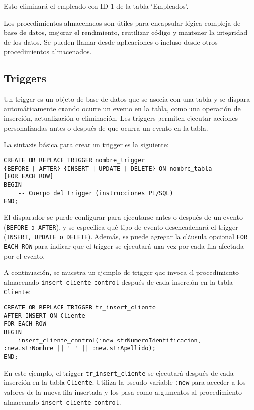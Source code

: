 \documentclass[executivepaper]{article}
\begin{document}
Esto eliminará el empleado con ID 1 de la tabla \enquote*{Empleados}.

Los procedimientos almacenados son útiles para encapsular lógica compleja de base de datos, mejorar el rendimiento, reutilizar código y mantener la integridad de los datos. Se pueden llamar desde aplicaciones o incluso desde otros procedimientos almacenados.

\subsection{Triggers}

Un trigger es un objeto de base de datos que se asocia con una tabla y se dispara automáticamente cuando ocurre un evento en la tabla, como una operación de inserción, actualización o eliminación. Los triggers permiten ejecutar acciones personalizadas antes o después de que ocurra un evento en la tabla.

La sintaxis básica para crear un trigger es la siguiente:

\begin{lstlisting}
CREATE OR REPLACE TRIGGER nombre_trigger
{BEFORE | AFTER} {INSERT | UPDATE | DELETE} ON nombre_tabla
[FOR EACH ROW]
BEGIN
    -- Cuerpo del trigger (instrucciones PL/SQL)
END;
\end{lstlisting}

El disparador se puede configurar para ejecutarse antes o después de un evento (\lstinline{BEFORE o AFTER}), y se especifica qué tipo de evento desencadenará el trigger (\lstinline{INSERT, UPDATE o DELETE}). Además, se puede agregar la cláusula opcional \lstinline{FOR EACH ROW} para indicar que el trigger se ejecutará una vez por cada fila afectada por el evento.

A continuación, se muestra un ejemplo de trigger que invoca el procedimiento almacenado \texttt{insert\_cliente\_control} después de cada inserción en la tabla \texttt{Cliente}:

\begin{lstlisting}
CREATE OR REPLACE TRIGGER tr_insert_cliente
AFTER INSERT ON Cliente
FOR EACH ROW
BEGIN
    insert_cliente_control(:new.strNumeroIdentificacion, :new.strNombre || ' ' || :new.strApellido);
END;
\end{lstlisting}

En este ejemplo, el trigger \texttt{tr\_insert\_cliente} se ejecutará después de cada inserción en la tabla \texttt{Cliente}. Utiliza la pseudo-variable \texttt{:new} para acceder a los valores de la nueva fila insertada y los pasa como argumentos al procedimiento almacenado \texttt{insert\_cliente\_control}.
\end{document}
